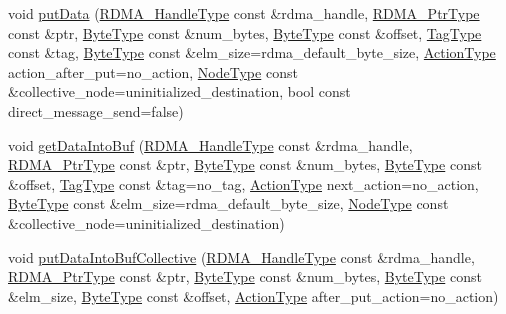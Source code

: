 \begin{DoxyCompactItemize}
\item 
void \hyperlink{structvt_1_1rdma_1_1_r_d_m_a_manager_a839c0031a48c5341494b119b0f10bafa}{put\+Data} (\hyperlink{namespacevt_a10442579ec4e7ebef223818e64bcf908}{R\+D\+M\+A\+\_\+\+Handle\+Type} const \&rdma\+\_\+handle, \hyperlink{namespacevt_a9e2c953286c7616f7c218e9951790776}{R\+D\+M\+A\+\_\+\+Ptr\+Type} const \&ptr, \hyperlink{namespacevt_aab8d55968084610ce3b17057981e9300}{Byte\+Type} const \&num\+\_\+bytes, \hyperlink{namespacevt_aab8d55968084610ce3b17057981e9300}{Byte\+Type} const \&offset, \hyperlink{namespacevt_a84ab281dae04a52a4b243d6bf62d0e52}{Tag\+Type} const \&tag, \hyperlink{namespacevt_aab8d55968084610ce3b17057981e9300}{Byte\+Type} const \&elm\+\_\+size=rdma\+\_\+default\+\_\+byte\+\_\+size, \hyperlink{namespacevt_ae0a5a7b18cc99d7b732cb4d44f46b0f3}{Action\+Type} action\+\_\+after\+\_\+put=no\+\_\+action, \hyperlink{namespacevt_a866da9d0efc19c0a1ce79e9e492f47e2}{Node\+Type} const \&collective\+\_\+node=uninitialized\+\_\+destination, bool const direct\+\_\+message\+\_\+send=false)
\item 
void \hyperlink{structvt_1_1rdma_1_1_r_d_m_a_manager_aa97aeb2fee7d1a1b2228ff063d64eb5f}{get\+Data\+Into\+Buf} (\hyperlink{namespacevt_a10442579ec4e7ebef223818e64bcf908}{R\+D\+M\+A\+\_\+\+Handle\+Type} const \&rdma\+\_\+handle, \hyperlink{namespacevt_a9e2c953286c7616f7c218e9951790776}{R\+D\+M\+A\+\_\+\+Ptr\+Type} const \&ptr, \hyperlink{namespacevt_aab8d55968084610ce3b17057981e9300}{Byte\+Type} const \&num\+\_\+bytes, \hyperlink{namespacevt_aab8d55968084610ce3b17057981e9300}{Byte\+Type} const \&offset, \hyperlink{namespacevt_a84ab281dae04a52a4b243d6bf62d0e52}{Tag\+Type} const \&tag=no\+\_\+tag, \hyperlink{namespacevt_ae0a5a7b18cc99d7b732cb4d44f46b0f3}{Action\+Type} next\+\_\+action=no\+\_\+action, \hyperlink{namespacevt_aab8d55968084610ce3b17057981e9300}{Byte\+Type} const \&elm\+\_\+size=rdma\+\_\+default\+\_\+byte\+\_\+size, \hyperlink{namespacevt_a866da9d0efc19c0a1ce79e9e492f47e2}{Node\+Type} const \&collective\+\_\+node=uninitialized\+\_\+destination)
\item 
void \hyperlink{structvt_1_1rdma_1_1_r_d_m_a_manager_a9f5bbbbdc2d6cca20f3bd5a259ecaf62}{put\+Data\+Into\+Buf\+Collective} (\hyperlink{namespacevt_a10442579ec4e7ebef223818e64bcf908}{R\+D\+M\+A\+\_\+\+Handle\+Type} const \&rdma\+\_\+handle, \hyperlink{namespacevt_a9e2c953286c7616f7c218e9951790776}{R\+D\+M\+A\+\_\+\+Ptr\+Type} const \&ptr, \hyperlink{namespacevt_aab8d55968084610ce3b17057981e9300}{Byte\+Type} const \&num\+\_\+bytes, \hyperlink{namespacevt_aab8d55968084610ce3b17057981e9300}{Byte\+Type} const \&elm\+\_\+size, \hyperlink{namespacevt_aab8d55968084610ce3b17057981e9300}{Byte\+Type} const \&offset, \hyperlink{namespacevt_ae0a5a7b18cc99d7b732cb4d44f46b0f3}{Action\+Type} after\+\_\+put\+\_\+action=no\+\_\+action)

\end{DoxyCompactItemize}
